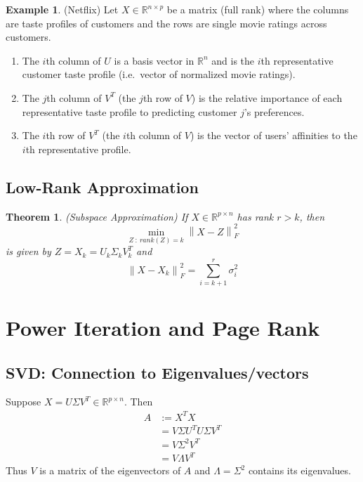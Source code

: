 \documentclass[12pt]{article}
\newtheorem{theorem}{Theorem}
\theoremstyle{definition}
\newtheorem{example}{Example}
\newcommand{\R}{\mathbb{R}}
\newcommand{\norm}[1]{\left\lVert#1\right\rVert}
\begin{document}
\begin{example}(Netflix)
	Let $X \in \R^{n \times p}$ be a matrix (full rank) where the columns are taste profiles of customers and the rows are single movie ratings across customers. 
	\begin{enumerate}
		\item The $i$th column of $U$ is a basis vector in $\R^n$ and is the $i$th representative customer taste profile (i.e.\ vector of normalized movie ratings). 
		\item The $j$th column of $V^T$ (the $j$th row of $V$) is the relative importance of each representative taste profile to predicting customer $j$'s preferences.
		\item The $i$th row of $V^T$ (the $i$th column of $V$) is the vector of users' affinities to the $i$th representative profile. 
	\end{enumerate}
\end{example}

\subsection{Low-Rank Approximation}

\begin{theorem}(Subspace Approximation)
	If $X \in \R^{p \times n}$ has rank $r > k$, then 
	\begin{equation}
		\min_{Z \ : \ rank(Z)=k} \norm{X - Z}^2_F
	\end{equation}
	is given by $Z = X_k = U_k \Sigma_k V_k^T$ and
	\begin{equation}
		\norm{X - X_k}^2_F = \sum_{i=k+1}^r \sigma^2_i
	\end{equation}
\end{theorem}

\section{Power Iteration and Page Rank}

\subsection{SVD: Connection to Eigenvalues/vectors}
Suppose $X = U \Sigma V^T \in \R^{p \times n}$. Then
\begin{align*}
	A &:= X^T X \\
	&= V \Sigma U^T U \Sigma V^T \\
	&= V \Sigma^2 V^T \\
	&= V \Lambda V^T
\end{align*}
Thus $V$ is a matrix of the eigenvectors of $A$ and $\Lambda = \Sigma^2$ contains its eigenvalues. 
\end{document}
